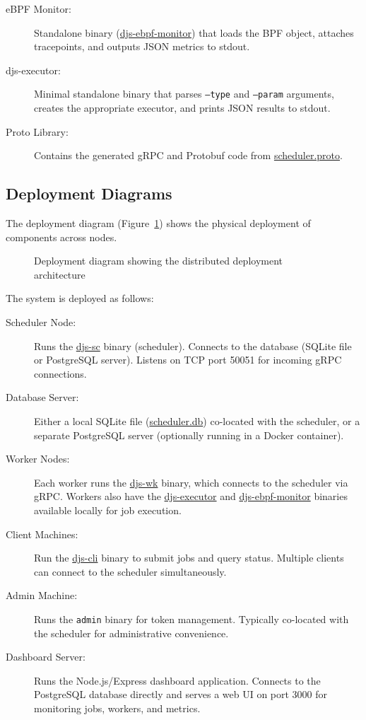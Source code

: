\begin{description}
	\item[eBPF Monitor:] Standalone binary (\url{djs-ebpf-monitor}) that loads the BPF object, attaches tracepoints, and outputs JSON metrics to stdout.

	\item[djs-executor:] Minimal standalone binary that parses \texttt{--type} and \texttt{--param} arguments, creates the appropriate executor, and prints JSON results to stdout.

	\item[Proto Library:] Contains the generated gRPC and Protobuf code from \url{scheduler.proto}.
\end{description}

\subsection{Deployment Diagrams}

The deployment diagram (Figure~\ref{fig:deployment-diagram}) shows the physical deployment of components across nodes.

\begin{figure}[htbp]
	\centering
	\caption{Deployment diagram showing the distributed deployment architecture}
	\label{fig:deployment-diagram}
\end{figure}

The system is deployed as follows:

\begin{description}
	\item[Scheduler Node:] Runs the \url{djs-sc} binary (scheduler). Connects to the database (SQLite file or PostgreSQL server). Listens on TCP port 50051 for incoming gRPC connections.

	\item[Database Server:] Either a local SQLite file (\url{scheduler.db}) co-located with the scheduler, or a separate PostgreSQL server (optionally running in a Docker container).

	\item[Worker Nodes:] Each worker runs the \url{djs-wk} binary, which connects to the scheduler via gRPC. Workers also have the \url{djs-executor} and \url{djs-ebpf-monitor} binaries available locally for job execution.

	\item[Client Machines:] Run the \url{djs-cli} binary to submit jobs and query status. Multiple clients can connect to the scheduler simultaneously.

	\item[Admin Machine:] Runs the \texttt{admin} binary for token management. Typically co-located with the scheduler for administrative convenience.

	\item[Dashboard Server:] Runs the Node.js/Express dashboard application. Connects to the PostgreSQL database directly and serves a web UI on port 3000 for monitoring jobs, workers, and metrics.
\end{description}

